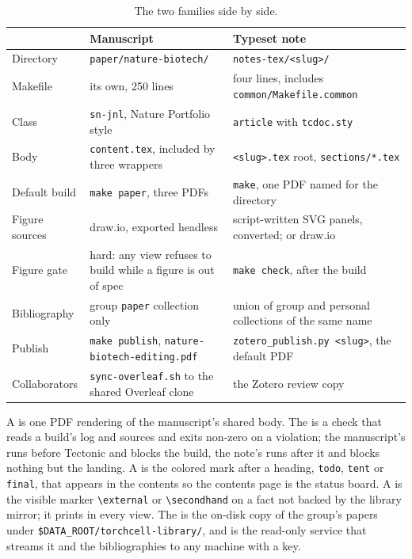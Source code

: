 \begin{table}[htbp]
\centering
\footnotesize
\caption{The two families side by side.}
\label{tab:families}
\begin{tabular}{lp{}p{}}
\toprule
 & Manuscript & Typeset note \\
\midrule
Directory & \texttt{paper/nature-biotech/} & \texttt{notes-tex/<slug>/} \\
Makefile & its own, 250 lines & four lines, includes \texttt{common/Makefile.common} \\
Class & \texttt{sn-jnl}, Nature Portfolio style & \texttt{article} with \texttt{tcdoc.sty} \\
Body & \texttt{content.tex}, included by three wrappers & \texttt{<slug>.tex} root, \texttt{sections/*.tex} \\
Default build & \texttt{make paper}, three PDFs & \texttt{make}, one PDF named for the directory \\
Figure sources & draw.io, exported headless & script-written SVG panels, converted; or draw.io \\
Figure gate & hard: any view refuses to build while a figure is out of spec & \texttt{make check}, after the build \\
Bibliography & group \texttt{paper} collection only & union of group and personal collections of the same name \\
Publish & \texttt{make publish}, \texttt{nature-biotech-editing.pdf} & \texttt{zotero\_publish.py <slug>}, the default PDF \\
Collaborators & \texttt{sync-overleaf.sh} to the shared Overleaf clone & the Zotero review copy \\
\bottomrule
\end{tabular}
\end{table}

A  is one PDF rendering of the manuscript's shared body. The
 is a check that reads a build's log and sources and exits non-zero on
a violation; the manuscript's runs before Tectonic and blocks the build, the note's
runs after it and blocks nothing but the landing. A  is the
colored mark after a heading, \texttt{todo}, \texttt{tent} or \texttt{final}, that
appears in the contents so the contents page is the status board. A
 is the visible marker \texttt{\textbackslash external} or
\texttt{\textbackslash secondhand} on a fact not backed by the library mirror; it
prints in every view. The  is the on-disk copy of the group's papers
under \texttt{\$DATA\_ROOT/torchcell-library/}, and  is the read-only
service that streams it and the bibliographies to any machine with a key.

